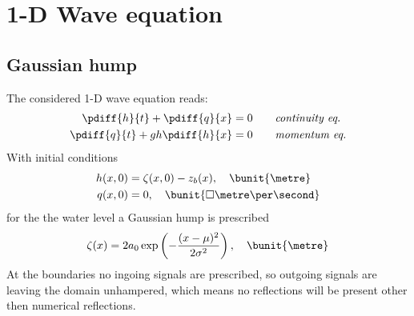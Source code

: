 \section{1-D Wave equation}
\subsection{Gaussian hump}\label{sec:numerical_experiment}
The considered 1-D wave equation reads:
\begin{align}
    \pdiff{h}{t}  + \pdiff{q}{x} & = 0 \qquad \textit{continuity eq.} \\
    \pdiff{q}{t}  + g h \pdiff{h}{x} & = 0 \qquad \textit{momentum eq.}
\end{align}
%
With initial conditions
\begin{align}
    h(x,0) & = \zeta(x,0) - z_b(x), \quad \bunit{\metre} \\
    q(x,0) & = 0, \quad \bunit{\square\metre\per\second}
\end{align}
for the the water level a Gaussian hump is prescribed
\begin{align}
    \zeta(x) = 2 a_0 \exp\left( - \frac{(x - \mu)^2}{2\sigma^2}  \right), \quad \bunit{\metre}
\end{align}
At the boundaries no ingoing signals are prescribed, so outgoing signals are leaving the domain unhampered, which means no reflections will be present other then numerical reflections.
